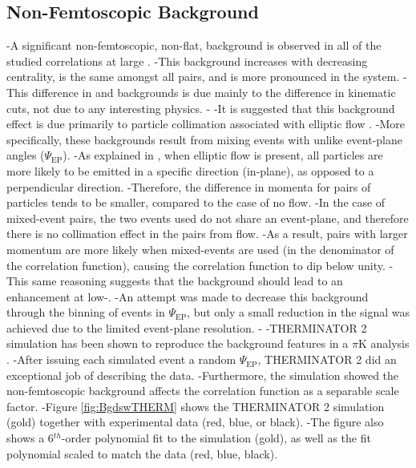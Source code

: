 \begin{table}[htbp]
\begin{table}[htbp]
 
 
 \subsection{Non-Femtoscopic Background}
 \label{NonFlatBackground}
 
-A significant non-femtoscopic, non-flat, background is observed in all of the studied \LamK correlations at large \kstar.  
-This background increases with decreasing centrality, is the same amongst all \LamKpm pairs, and is more pronounced in the \LamKs system.
-This difference in \LamKpm and \LamKs backgrounds is due mainly to the difference in kinematic cuts, not due to any interesting physics.  
-
-It is suggested that this background effect is due primarily to particle collimation associated with elliptic flow \cite{Kisiel:2017}.  
-More specifically, these backgrounds result from mixing events with unlike event-plane angles ($\Psi_{\textrm{EP}}$).  
-As explained in \cite{Kisiel:2017}, when elliptic flow is present, all particles are more likely to be emitted in a specific direction (in-plane), as opposed to a perpendicular direction.  
-Therefore, the difference in momenta for pairs of particles tends to be smaller, compared to the case of no flow.  
-In the case of mixed-event pairs, the two events used do not share an event-plane, and therefore there is no collimation effect in the pairs from flow.  
-As a result, pairs with larger momentum are more likely when mixed-events are used (in the denominator of the correlation function), causing the correlation function to dip below unity.  
-This same reasoning suggests that the background should lead to an enhancement at low-\kstar. 
-An attempt was made to decrease this background through the binning of events in $\Psi_{\mathrm{EP}}$, but only a small reduction in the signal was achieved due to the limited event-plane resolution.
-
-THERMINATOR 2 simulation has been shown to reproduce the background features in a $\pi$K analysis \cite{Kisiel:2017}.  
-After issuing each simulated event a random $\Psi_{\mathrm{EP}}$, THERMINATOR 2 did an exceptional job of describing the \LamK data.  
-Furthermore, the simulation showed the non-femtoscopic background affects the correlation function as a separable scale factor.
-Figure \ref{fig:BgdswTHERM} shows the THERMINATOR 2 simulation (gold) together with experimental data (red, blue, or black).  
-The figure also shows a 6$^{th}$-order polynomial fit to the simulation (gold), as well as the fit polynomial scaled to match the data (red, blue, black).

\end{table}
\end{table}
